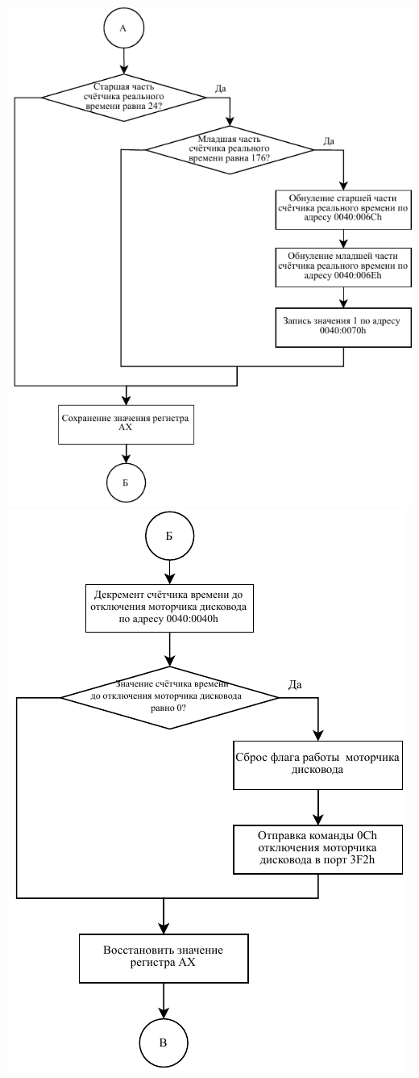 \documentclass[a4paper,12pt]{article}
\begin{document}
\begin{center}
    \includegraphics[height=0.9\textheight]{flowchart/2.pdf}
    \includegraphics[height=0.95\textheight]{flowchart/3.pdf}

\end{center}
\end{document}
